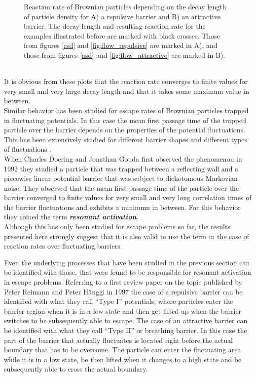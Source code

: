 \begin{minipage}[t]{1 \textwidth}
    \begin{figure}[H]
        \caption{Reaction rate of Brownian particles depending on the decay length of particle density for A) a repulsive barrier and B) an attractive barrier. The decay length and resulting reaction rate for the examples illustrated before are marked with black crosses. Those from figures \ref{rsd} and \ref{fig:flow_repulsive}  are marked in A), and those from figures \ref{asd} and \ref{fig:flow_attractive} are marked in B).\label{reaction_rate_examples}}
    \end{figure}
\end{minipage}
\vspace{.5 cm} \\
It is obvious from these plots that the reaction rate converges to finite values for very small and very large decay length and that it takes some maximum value in between. \\
Similar behavior has been studied for escape rates of Brownian particles trapped in fluctuating potentials. In this case the mean first passage time of the trapped particle over the barrier depends on the properties of the potential fluctuations. This has been extensively studied for different barrier shapes and different types of fluctuations \cite{Doering1992, Zurcher1993, Hanggi1994, Pechukas1994,Reimann1995a, Reimann1995}. \\
When Charles Doering and Jonathan Gouda first observed the phenomenon in 1992 \cite{Doering1992} they studied a particle that was trapped between a reflecting wall and a piecewise linear potential barrier that was subject to dichotomous Markovian noise. They observed that the mean first passage time of the particle over the barrier converged to finite values for very small and very long correlation times of the barrier fluctuations and exhibits a minimum in between. For this behavior they coined the term\textbf{ \emph{resonant activation}}.\\
Although this has only been studied for escape problems so far, the results presented here strongly suggest that it is also valid to use the term in the case of reaction rates over fluctuating barriers. \par
Even the underlying processes that have been studied in the previous section can be identified with those, that were found to be responsible for resonant activation in escape problems.
Referring to a first review paper on the topic published by Peter Reimann and Peter H\"anggi in 1997 \cite{Reimann1997} the case of a repulsive barrier can be identified with what they call ``Type I'' potentials, where particles enter the barrier region when it is in a low state and then get lifted up when the barrier switches to be subsequently able to escape. The case of an attractive barrier can be identified with what they call ``Type II'' or breathing barrier. In this case the part of the barrier that actually fluctuates is located right before the actual boundary that has to be overcome. The particle can enter the fluctuating area while it is in a low state, be then lifted when it changes to a high state and be subsequently able to cross the actual boundary. \par

